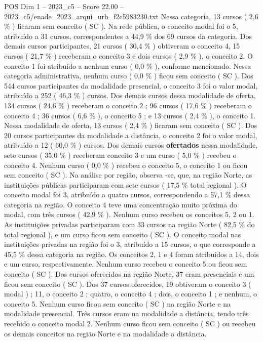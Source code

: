 \begin{textsample}{POS Dim 1 – 2023\_c5 – Score 22.00 – 2023\_c5/enade\_2023\_arqui\_urb\_f2c5983230.txt}
Nessa categoria, 13 cursos ( 2,6 \% ) ficaram sem conceito ( SC ).
Na rede pública, o conceito modal foi o 5, atribuído a 31 cursos, correspondentes a 44,9 \% dos 69 cursos da categoria.
Dos demais cursos participantes, 21 cursos ( 30,4 \% ) obtiveram o conceito 4, 15 cursos ( 21,7 \% ) receberam o conceito 3 e dois cursos ( 2,9 \% ), o conceito 2.
O conceito 1 foi atribuído a nenhum curso ( 0,0 \% ), conforme mencionado.
Nessa categoria administrativa, nenhum curso ( 0,0 \% ) ficou sem conceito ( SC ).
Dos 544 cursos participantes da modalidade presencial, o conceito 3 foi o valor modal, atribuído a 252 ( 46,3 \% ) cursos.
Dos demais cursos dessa modalidade de oferta, 134 cursos ( 24,6 \% ) receberam o conceito 2 ; 96 cursos ( 17,6 \% ) receberam o conceito 4 ; 36 cursos ( 6,6 \% ), o conceito 5 ; e 13 cursos ( 2,4 \% ), o conceito 1.
Nessa modalidade de oferta, 13 cursos ( 2,4 \% ) ficaram sem conceito ( SC ).
Dos 20 cursos participantes da modalidade a distância, o conceito 2 foi o valor modal, atribuído a 12 ( 60,0 \% ) cursos.
Dos demais cursos \textbf{ofertados} nessa modalidade, sete cursos ( 35,0 \% ) receberam conceito 3 e um curso ( 5,0 \% ) recebeu o conceito 4.
Nenhum curso ( 0,0 \% ) recebeu o conceito 5, o conceito 1 ou ficou sem conceito ( SC ).
Na análise por região, observa -se, que, na região Norte, as instituições públicas participaram com sete cursos ( 17,5 \% total regional ).
O conceito modal foi 3, atribuído a quatro cursos, correspondendo a 57,1 \% dessa categoria na região.
O conceito 4 teve uma concentração muito próxima do modal, com três cursos ( 42,9 \% ).
Nenhum curso recebeu os conceitos 5, 2 ou 1.
As instituições privadas participaram com 33 cursos na região Norte ( 82,5 \% do total regional ), e um curso ficou sem conceito ( SC ).
O conceito modal nas instituições privadas na região foi o 3, atribuído a 15 cursos, o que corresponde a 45,5 \% dessa categoria na região.
Os conceitos 2, 1 e 4 foram atribuídos a 14, dois e um curso, respectivamente.
Nenhum curso recebeu o conceito 5 ou ficou sem conceito ( SC ).
Dos cursos oferecidos na região Norte, 37 eram presenciais e um ficou sem conceito ( SC ).
Dos 37 cursos oferecidos, 19 obtiveram o conceito 3 ( modal ) ; 11, o conceito 2 ; quatro, o conceito 4 ; dois, o conceito 1 ; e nenhum, o conceito 5.
Nenhum curso ficou sem conceito ( SC ) na região Norte e na modalidade presencial.
Três cursos eram na modalidade a distância, tendo três recebido o conceito modal 2.
Nenhum curso ficou sem conceito ( SC ) ou recebeu os demais conceitos na região Norte e na modalidade a distância.

\end{textsample}
